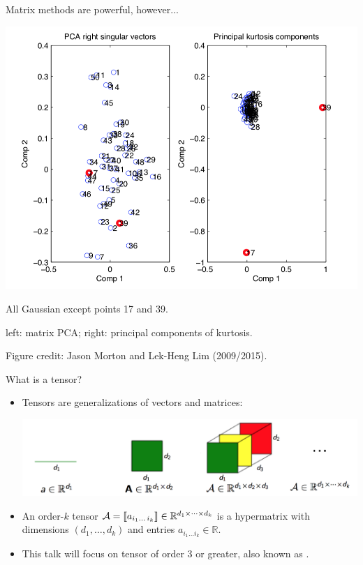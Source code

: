 \documentclass[10pt, mathserif]{beamer} %
\theoremstyle{definition}
\theoremstyle{plain}
\begin{document}
\begin{frame}{Matrix methods are powerful, however...}

\centerline{ \includegraphics[width=.7\textwidth]{Figures/PCA.png}}

All Gaussian except points 17 and 39. 

left: matrix PCA;  right: principal components of kurtosis.

{\scriptsize Figure credit: Jason Morton and Lek-Heng Lim (2009/2015).}
\end{frame}


\begin{frame}{What is a tensor?}

\begin{itemize}

\item Tensors are generalizations of vectors and matrices:

\onslide \includegraphics[width=.9\textwidth]{Figures/defn.png}
\item An order-$k$ tensor $\mathcal{A} = \llbracket a_{i_1\dots\, i_k} \rrbracket  \in \mathbb{R}^{d_1 \times \dots \times d_k}$ is a hypermatrix with dimensions $(d_1,\ldots,d_k)$ and entries $a_{i_1\dots i_k}\in\mathbb{R}$.
\item This talk will focus on tensor of order $3$ or greater, also known as .
\end{itemize}
\end{frame}
\end{document}
